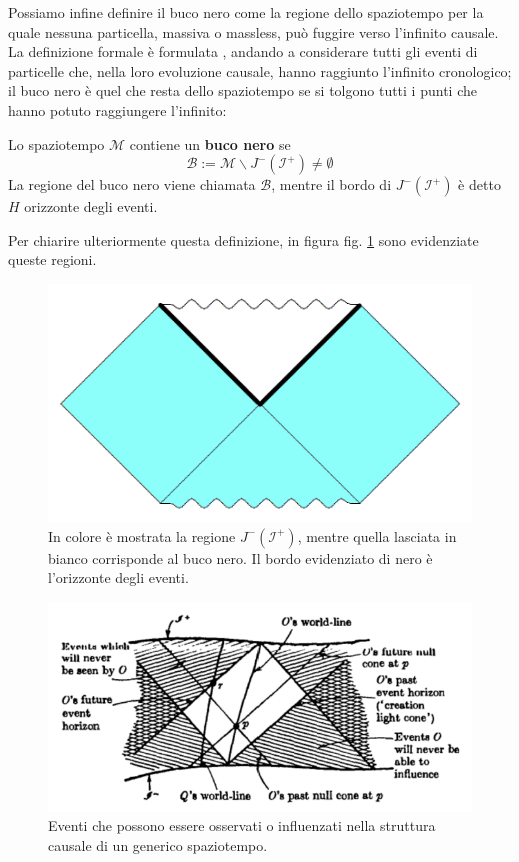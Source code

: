 Possiamo infine definire il buco nero come la regione dello spaziotempo per la quale nessuna particella, massiva o massless, può fuggire verso l'infinito causale. La definizione formale è formulata , andando a considerare tutti gli eventi di particelle che, nella loro evoluzione causale, hanno raggiunto l'infinito cronologico; il buco nero è quel che resta dello spaziotempo se si tolgono tutti i punti che hanno potuto raggiungere l'infinito:
\begin{definizione}
Lo spaziotempo $\mathcal{M}$ contiene un \textbf{buco nero} se
\begin{equation*}
    \mathcal{B}:= \mathcal{M}\smallsetminus J^-(\mathcal{I}^+) \neq \emptyset
\end{equation*}
La regione del buco nero viene chiamata $\mathcal{B}$, mentre il bordo di $J^-(\mathcal{I}^+)$ è detto $H$ orizzonte degli eventi.
\end{definizione}

Per chiarire ulteriormente questa definizione, in figura fig. \ref{fig.penrose_schwarz_buconero} sono evidenziate queste regioni.
\begin{figure}
    \centering
    \includegraphics[scale=0.3]{immagini/schwarz_bh_regioni.png}
    \caption{In colore è mostrata la regione $J^-(\mathcal{I}^+)$, mentre quella lasciata in bianco corrisponde al buco nero. Il bordo evidenziato di nero è l'orizzonte degli eventi.}
    \label{fig.penrose_schwarz_buconero}
\end{figure}
\begin{figure}[t]
    \centering
    \includegraphics[scale=0.6]{immagini/horizons_hawk.png}
    \caption{Eventi che possono essere osservati o influenzati nella struttura causale di un generico spaziotempo.}
    \label{fig.orizzonti_hawk}
\end{figure}
